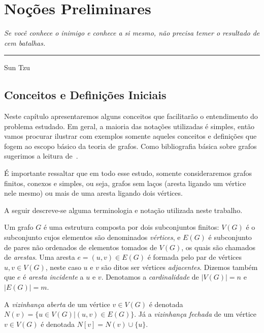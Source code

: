 \chapter{Noções Preliminares}\label{Notions}


\begin{flushright}
\begin{minipage}[t][0cm][b]{0.47\textwidth}
\emph{Se você conhece o inimigo e conhece a si mesmo, não precisa temer o resultado de cem batalhas. }
\end{minipage}

\rule[0cm]{7cm}{0.03cm}%

Sun Tzu
\end{flushright}

\section{Conceitos e Definições Iniciais}

Neste capítulo apresentaremos alguns conceitos que facilitarão o entendimento do problema estudado. Em geral, a maioria das notações utilizadas é simples, então vamos procurar ilustrar com exemplos somente aqueles conceitos e definições que fogem ao escopo básico da teoria de grafos. Como bibliografia básica sobre grafos sugerimos a leitura de~\cite{jayme2018}.

É importante ressaltar que em todo esse estudo, somente consideraremos grafos finitos, conexos e simples, ou seja, grafos sem
laços (aresta ligando um vértice nele mesmo) ou mais de uma aresta ligando dois
vértices.

A seguir descreve-se alguma terminologia e notação utilizada neste trabalho.

Um grafo $G$ é uma estrutura composta por dois subconjuntos finitos: $V(G)$ é o subconjunto cujos elementos são denominados \emph{vértices}, e $E(G)$ é subconjunto de pares não ordenados de elementos tomados de $V(G)$, os quais são chamados de \emph{arestas}. Uma aresta $e = (u,v)\in E(G)$ é formada pelo par de vértices $u,v \in V(G)$, neste caso $u$ e $v$ são ditos ser vértices \emph{adjacentes}. Dizemos também que  $e$ é \emph{aresta incidente} a $u$ e $v$. Denotamos a \emph{cardinalidade} de $|V(G)| = n$ e $|E(G)| = m$.

A \emph{vizinhança aberta} de um vértice $v\in V(G)$ é denotada $N(v) = \{u\in V(G) | (u,v) \in E(G)\}$. Já a \emph{vizinhança fechada} de um vértice $v\in V(G)$ é denotada $N[v] = N(v) \cup \{u\}$. 

